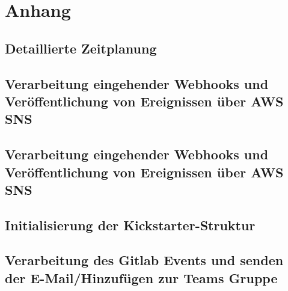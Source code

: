 \section{Anhang}
\subsection{Detaillierte Zeitplanung}
\label{app:Zeitplanung}

\clearpage


\clearpage




\clearpage

\clearpage


\subsection{Verarbeitung eingehender Webhooks und Veröffentlichung von Ereignissen über AWS SNS}
\label{app:CNMI}

\clearpage

\subsection{Verarbeitung eingehender Webhooks und Veröffentlichung von Ereignissen über AWS SNS}
\label{app:CNMI}

\clearpage

\subsection{Initialisierung der Kickstarter-Struktur}
\label{app:kickStruct}

\clearpage

\subsection{Verarbeitung des Gitlab Events und senden der E-Mail/Hinzufügen zur Teams Gruppe}
\label{app:kickMain}

\clearpage

